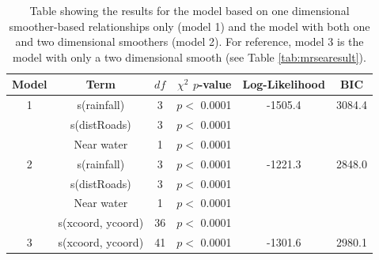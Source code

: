 \documentclass[letterpaper, 12pt]{interact}
\begin{document}
	
	\begin{table}[!ht]
		\centering
		\caption{Table showing the results for the model based on one dimensional smoother-based relationships only (model 1) and the model with both one and two dimensional smoothers (model 2). For reference, model 3 is the model with only a two dimensional smooth (see Table \ref{tab:mrsearesult}).}
		\vspace{0.5cm}
		\begin{tabular}{c|c|c|r|c|c}
			Model & Term  & $df$ & $\chi^2$ $p$-value  & Log-Likelihood & BIC\\\hline
			1 & s(rainfall) & 3 & $p <$ 0.0001  &  -1505.4 & 3084.4\\
			& s(distRoads) & 3 & $p <$ 0.0001  &  & \\
			& Near water & 1 & $p <$ 0.0001  &  & \\\hline
			2 & s(rainfall) & 3 &  $p <$ 0.0001  & -1221.3 & 2848.0\\
			& s(distRoads) & 3 & $p <$ 0.0001  & &\\
			& Near water & 1 & $p <$ 0.0001  & &\\
			& s(xcoord, ycoord) &  36 &  $p <$ 0.0001  & &\\\hline
			3 & s(xcoord, ycoord) & 41 & $p <$ 0.0001 & -1301.6 & 2980.1\\\hline
		\end{tabular}
		\label{tab:1Dresult}
	\end{table}
	
	
	
\end{document}
